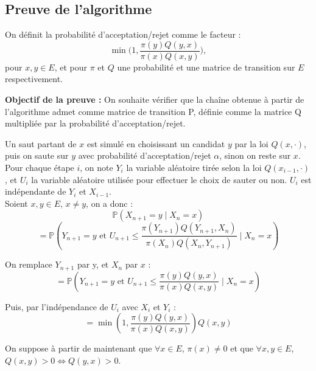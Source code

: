 \documentclass{article}
\begin{document}
\subsection{Preuve de l'algorithme}


\begin{tcolorbox}[colback=white,colframe=blue!80!black,title=Probabilité d'acceptation/rejet]
On définit la probabilité d'acceptation/rejet comme le facteur :
\[
\min\big(1, \frac{\pi(y) Q(y, x)}{\pi(x) Q(x, y)} \big),
\]
pour $x, y \in E$, et pour $\pi$ et $Q$ une probabilité et une matrice de transition sur $E$ respectivement.
\end{tcolorbox}

\textbf{Objectif de la preuve :}
On souhaite vérifier que la chaîne obtenue à partir de l'algorithme admet comme matrice de transition P, définie comme la matrice Q multipliée par la probabilité d'acceptation/rejet. \\

\begin{tcolorbox}[colback=white,colframe=green!80!black,title=Démonstration]
Un saut partant de $x$ est simulé en choisissant un candidat $y$ par la loi $Q(x, \cdot)$, puis on saute sur $y$ avec probabilité d'acceptation/rejet $\alpha$, sinon on reste sur $x$. \\ %

Pour chaque étape $i$, on note $Y_i$ la variable aléatoire tirée selon la loi $Q(x_{i-1}, \cdot)$, et $U_i$ la variable aléatoire utilisée pour effectuer le choix de sauter ou non. $U_i$ est indépendante de $Y_i$ et $X_{i-1}$. \\

Soient $x, y \in E$, $x \neq y$, on a donc :
\[
\mathbb{P}(X_{n+1} = y \mid X_n = x)
\]
\[
= \mathbb{P}(Y_{n+1} = y \text{ et } U_{n+1} \leq \frac{\pi(Y_{n+1}) Q(Y_{n+1}, X_n)}{\pi(X_n) Q(X_n, Y_{n+1})} \mid X_n = x)
\]

On remplace $Y_{n+1}$ par y, et $X_n$ par $x$ :
\[
= \mathbb{P}(Y_{n+1} = y \text{ et } U_{n+1} \leq \frac{\pi(y) Q(y, x)}{\pi(x) Q(x, y)} \mid X_n = x)
\]

Puis, par l'indépendance de $U_i$ avec $X_i$ et $Y_i$ :
\[
= \min(1, \frac{\pi(y) Q(y, x)}{\pi(x) Q(x, y)})Q(x, y)
\]
\end{tcolorbox}

On suppose à partir de maintenant que $\forall x \in E$, $\pi(x) \neq 0$ et que $\forall x, y \in E$, $Q(x, y) > 0 \iff Q(y, x) > 0$. \\
\end{document}

